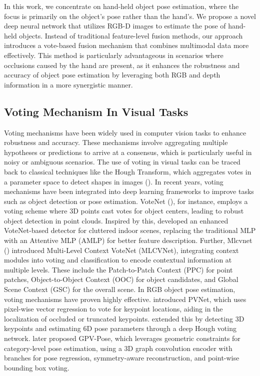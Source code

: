 In this work, we concentrate on hand-held object pose estimation, where the focus is primarily on the object's pose rather than the hand's. We propose a novel deep neural network that utilizes RGB-D images to estimate the pose of hand-held objects. Instead of traditional feature-level fusion methods, our approach introduces a vote-based fusion mechanism that combines multimodal data more effectively. This method is particularly advantageous in scenarios where occlusions caused by the hand are present, as it enhances the robustness and accuracy of object pose estimation by leveraging both RGB and depth information in a more synergistic manner.

\subsection{Voting Mechanism In Visual Tasks}

Voting mechanisms have been widely used in computer vision tasks to enhance robustness and accuracy. These mechanisms involve aggregating multiple hypotheses or predictions to arrive at a consensus, which is particularly useful in noisy or ambiguous scenarios. The use of voting in visual tasks can be traced back to classical techniques like the Hough Transform, which aggregates votes in a parameter space to detect shapes in images (\cite{hough1959machine}). In recent years, voting mechanisms have been integrated into deep learning frameworks to improve tasks such as object detection or pose estimation. VoteNet (\cite{qi2019deep}), for instance, employs a voting scheme where 3D points cast votes for object centers, leading to robust object detection in point clouds. Inspired by this, \cite{xie2021venet} developed an enhanced VoteNet-based detector for cluttered indoor scenes, replacing the traditional MLP with an Attentive MLP (AMLP) for better feature description. Further, Mlcvnet (\cite{xie2020mlcvnet}) introduced Multi-Level Context VoteNet (MLCVNet), integrating context modules into voting and classification to encode contextual information at multiple levels. These include the Patch-to-Patch Context (PPC) for point patches, Object-to-Object Context (OOC) for object candidates, and Global Scene Context (GSC) for the overall scene. In RGB object pose estimation, voting mechanisms have proven highly effective. \cite{peng2019pvnet} introduced PVNet, which uses pixel-wise vector regression to vote for keypoint locations, aiding in the localization of occluded or truncated keypoints. \cite{he2020pvn3d} extended this by detecting 3D keypoints and estimating 6D pose parameters through a deep Hough voting network. \cite{di2022gpv} later proposed GPV-Pose, which leverages geometric constraints for category-level pose estimation, using a 3D graph convolution encoder with branches for pose regression, symmetry-aware reconstruction, and point-wise bounding box voting.

